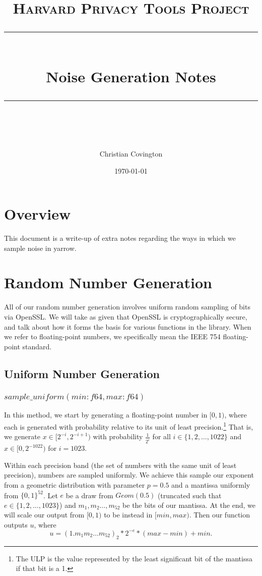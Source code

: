 \documentclass[11pt]{scrartcl} %
\title{
	\normalfont\normalsize
	\textsc{Harvard Privacy Tools Project}\\ %
	\vspace{25pt} %
	\rule{\linewidth}{0.5pt}\\ %
	\vspace{20pt} %
	{\huge Noise Generation Notes}\\ %
	\vspace{12pt} %
	\rule{\linewidth}{2pt}\\ %
	\vspace{12pt} %
}
\author{\LARGE Christian Covington} %
\date{\normalsize\today} %
\begin{document}
\maketitle

\section{Overview}
This document is a write-up of extra notes regarding the ways in which we sample noise in yarrow.

\section{Random Number Generation}
All of our random number generation involves uniform random sampling of bits via OpenSSL.
We will take as given that OpenSSL is cryptographically secure, and talk about how it
forms the basis for various functions in the library.
When we refer to floating-point numbers, we specifically mean the IEEE 754 floating-point standard.

\subsection{Uniform Number Generation}

\subsubsection{$sample\_uniform(min: f64, max: f64)$}
In this method, we start by generating a floating-point number in $[0,1)$,
where each is generated with probability relative to its unit of least precision.\footnote{The ULP is the value
represented by the least significant bit of the mantissa if that bit is a 1.}
That is, we generate $x \in [2^{-i}, 2^{-i+1})$ with probability $\frac{1}{2^i}$
for all $i \in \{1,2,\hdots,1022\}$ and $x \in [0, 2^{-1022})$ for $i = 1023$.

Within each precision band (the set of numbers with the same unit
of least precision), numbers are sampled uniformly.
We achieve this sample our exponent from a geometric distribution with parameter $p = 0.5$ and a mantissa uniformly from $\{0,1\}^{52}$.
Let $e$ be a draw from $Geom(0.5)$ (truncated such that $e \in \{1,2,\hdots,1023\}$) and $m_1, m_2 \hdots, m_{52}$ be the bits of our mantissa.
At the end, we will scale our output from $[0,1)$ to be instead in $[min, max)$. Then our function outputs $u$, where
\[ u = (1.m_1m_2 \hdots m_{52})_2 * 2^{-e} * (max - min) + min. \]
\end{document}
